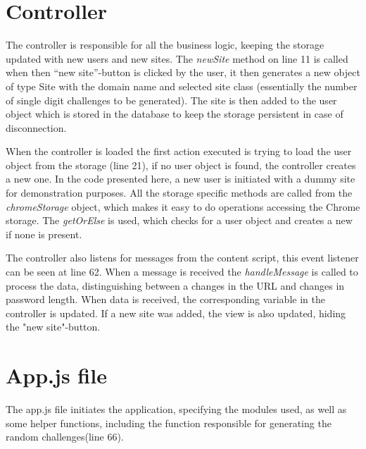 \section{Controller}\label{app:controller}

The controller is responsible for all the business logic, keeping the storage updated with new users and new sites. The \emph{newSite} method on line 11 is called when then ``new site''-button is clicked by the user, it then generates a new object of type Site with the domain name and selected site class (essentially the number of single digit challenges to be generated). The site is then added to the user object which is stored in the database to keep the storage persistent in case of disconnection. 
\par When the controller is loaded the first action executed is trying to load the user object from the storage (line 21), if no user object is found, the controller creates a new one. In the code presented here, a new user is initiated with a dummy site for demonstration purposes. All the storage specific methods are called from the \emph{chromeStorage} object, which makes it easy to do operations accessing the Chrome storage. The \emph{getOrElse} is used, which checks for a user object and creates a new if none is present. 
\par The controller also listens for messages from the content script, this event listener can be seen at line 62. When a message is received the \emph{handleMessage} is called to process the data, distinguishing between a changes in the URL and changes in password length. When data is received, the corresponding variable in the controller is updated. If a new site was added, the view is also updated, hiding the "new site"-button.

\section{App.js file}\label{app:app.js}


The app.js file initiates the application, specifying the modules used, as well as some helper functions, including the function responsible for generating the random challenges(line 66). 


